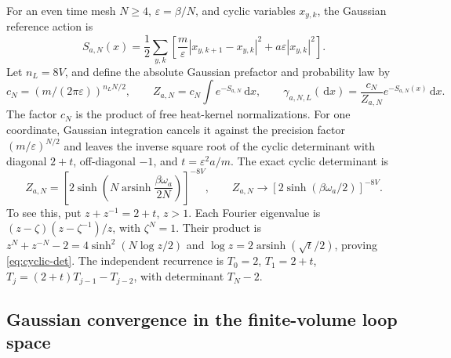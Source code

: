 \documentclass[11pt]{article}
\numberwithin{equation}{section}
\theoremstyle{definition}
\newcommand{\dd}{\,\mathrm d}
\newcommand{\eps}{\varepsilon}
\begin{document}
For an even time mesh $N\geq4$, $\eps=\beta/N$, and cyclic variables
$x_{y,k}$, the Gaussian reference action is
\begin{equation}
 S_{a,N}(x)=\frac12\sum_{y,k}\left[
 \frac m\eps|x_{y,k+1}-x_{y,k}|^2+a\eps|x_{y,k}|^2\right].
 \label{eq:mesh-action}
\end{equation}
Let $n_L=8V$, and define the absolute Gaussian prefactor and probability law by
\[
 c_N=(m/(2\pi\eps))^{n_LN/2},\qquad
 Z_{a,N}=c_N\int e^{-S_{a,N}}\dd x,\qquad
 \gamma_{a,N,L}(\dd x)=\frac{c_N}{Z_{a,N}}e^{-S_{a,N}(x)}\dd x.
\]
The factor $c_N$ is the product of free heat-kernel normalizations.  For one
coordinate, Gaussian integration cancels it against the precision factor
$(m/\eps)^{N/2}$ and leaves the inverse square root of the cyclic determinant
with diagonal $2+t$, off-diagonal $-1$, and $t=\eps^2a/m$.
The exact cyclic determinant is
\begin{equation}
 Z_{a,N}=\left[2\sinh\left(N\operatorname{arsinh}
       \frac{\beta\omega_a}{2N}\right)\right]^{-8V},
 \qquad Z_{a,N}\longrightarrow [2\sinh(\beta\omega_a/2)]^{-8V}.
 \label{eq:cyclic-det}
\end{equation}
To see this, put $z+z^{-1}=2+t$, $z>1$.  Each Fourier eigenvalue is
$(z-\zeta)(z-\zeta^{-1})/z$, with $\zeta^N=1$. Their product is
$z^N+z^{-N}-2=4\sinh^2(N\log z/2)$ and
$\log z=2\operatorname{arsinh}(\sqrt t/2)$, proving \eqref{eq:cyclic-det}.
The independent recurrence is
$T_0=2$, $T_1=2+t$, $T_j=(2+t)T_{j-1}-T_{j-2}$, with determinant $T_N-2$.

\subsection{Gaussian convergence in the finite-volume loop space}
\label{sec:gaussian-loop}
\end{document}
